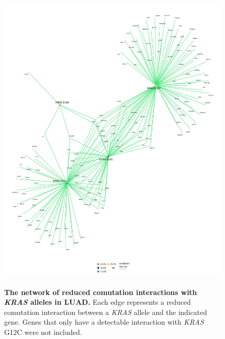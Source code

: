 \documentclass[english, 12pt, letterpaper]{article}
\newcommand{\KRAS}{\emph{KRAS}}
\begin{document}
\begin{figure}[p]
\centering
\includegraphics[height=150mm]{figures/SuppFigure_08.jpeg}
\caption{
    \textbf{The network of reduced comutation interactions with \KRAS{} alleles in LUAD.} Each edge represents a reduced comutation interaction between a \KRAS{} allele and the indicated gene. Genes that only have a detectable interaction with \KRAS{} G12C were not included.
}
\label{sfig:luad_labeled-reduced-comutation}
\end{figure}
\end{document}
